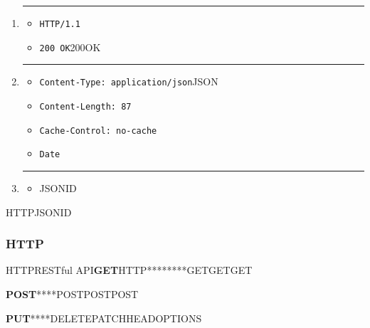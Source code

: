 \begin{enumerate}
\def\labelenumi{\arabic{enumi}.}
\item
  \begin{center}\rule{0.5\linewidth}{0.5pt}\end{center}

  \begin{itemize}
  \tightlist
  \item
    \texttt{HTTP/1.1}
  \item
    \texttt{200\ OK}200OK
  \end{itemize}
\item
  \begin{center}\rule{0.5\linewidth}{0.5pt}\end{center}

  \begin{itemize}
  \tightlist
  \item
    \texttt{Content-Type:\ application/json}JSON
  \item
    \texttt{Content-Length:\ 87}
  \item
    \texttt{Cache-Control:\ no-cache}
  \item
    \texttt{Date}
  \end{itemize}
\item
  \begin{center}\rule{0.5\linewidth}{0.5pt}\end{center}

  \begin{itemize}
  \tightlist
  \item
    JSONID
  \end{itemize}
\end{enumerate}

HTTPJSONID

\subsubsection{HTTP}\label{http-3}

HTTPRESTful API\textbf{GET}HTTP********GETGETGET

\textbf{POST}****POSTPOSTPOST

\textbf{PUT}****DELETEPATCHHEADOPTIONS

